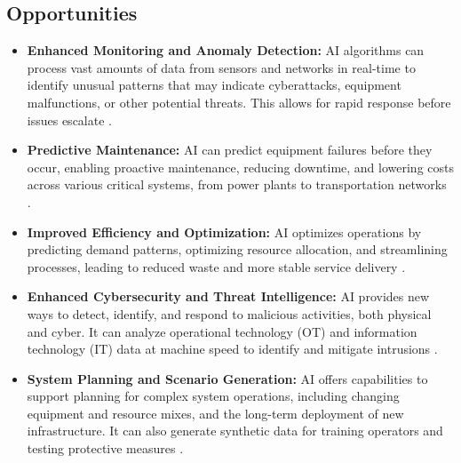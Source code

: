 \subsection{Opportunities}
\begin{itemize}
    \item \textbf{Enhanced Monitoring and Anomaly Detection:} AI algorithms can process vast amounts of data from sensors and networks in real-time to identify unusual patterns that may indicate cyberattacks, equipment malfunctions, or other potential threats. This allows for rapid response before issues escalate \parencite{DataFloq2023}.
    \item \textbf{Predictive Maintenance:} AI can predict equipment failures before they occur, enabling proactive maintenance, reducing downtime, and lowering costs across various critical systems, from power plants to transportation networks \parencite{EnergyGov2023}.
    \item \textbf{Improved Efficiency and Optimization:} AI optimizes operations by predicting demand patterns, optimizing resource allocation, and streamlining processes, leading to reduced waste and more stable service delivery \parencite{Checkpoint2023}.
    \item \textbf{Enhanced Cybersecurity and Threat Intelligence:} AI provides new ways to detect, identify, and respond to malicious activities, both physical and cyber. It can analyze operational technology (OT) and information technology (IT) data at machine speed to identify and mitigate intrusions \parencite{EAJournals2023}.
    \item \textbf{System Planning and Scenario Generation:} AI offers capabilities to support planning for complex system operations, including changing equipment and resource mixes, and the long-term deployment of new infrastructure. It can also generate synthetic data for training operators and testing protective measures \parencite{EnergyGov2023}.
\end{itemize}

